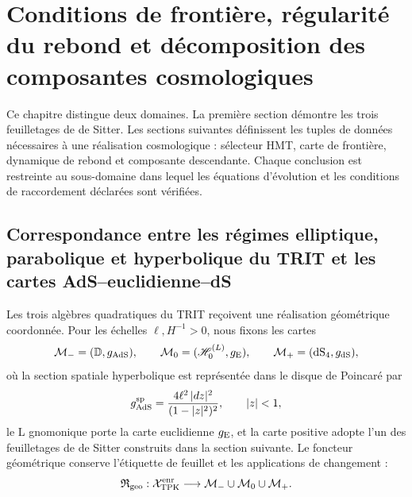 
\section{Conditions de frontière, régularité du rebond et décomposition des composantes cosmologiques}
\label{chap:cosmologia-frontera-rebote}

Ce chapitre distingue deux domaines. La première section démontre les trois
feuilletages de de Sitter. Les sections suivantes définissent les tuples de
données nécessaires à une réalisation cosmologique : sélecteur HMT, carte de
frontière, dynamique de rebond et composante descendante. Chaque conclusion est
restreinte au sous-domaine dans lequel les équations d'évolution et
les conditions de raccordement déclarées sont vérifiées.

\subsection{Correspondance entre les régimes elliptique, parabolique et hyperbolique du TRIT et les cartes AdS–euclidienne–dS}
\label{sec:atlas-ads-euclideo-ds-hmt}

Les trois algèbres quadratiques du TRIT reçoivent une réalisation géométrique
coordonnée. Pour les échelles \(\ell,H^{-1}>0\), nous fixons les cartes
\[
 \mathcal M_-=(\mathbb D, g_{\rm AdS}),
 \qquad
 \mathcal M_0=(\mathscr H_0^{(L)},g_{\rm E}),
 \qquad
 \mathcal M_+=(\mathrm{dS}_4,g_{\rm dS}),
\]
où la section spatiale hyperbolique est représentée dans le disque de Poincaré
par
\[
 g_{\rm AdS}^{\rm sp}
 =\frac{4\ell^2\,|dz|^2}{(1-|z|^2)^2},
 \qquad |z|<1,
\]
le L gnomonique porte la carte euclidienne \(g_{\rm E}\), et la carte positive
adopte l'un des feuilletages de de Sitter construits dans la section
suivante. Le foncteur géométrique conserve l'étiquette de feuillet et les applications de
changement :
\[
 \mathfrak R_{\rm geo}:\mathcal X_{\rm TPK}^{\rm enr}
 \longrightarrow
 \mathcal M_-\cup\mathcal M_0\cup\mathcal M_+.
\]

